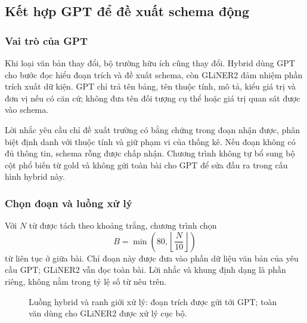 \subsection{Kết hợp GPT để đề xuất schema động}
\subsubsection{Vai trò của GPT}
Khi loại văn bản thay đổi, bộ trường hữu ích cũng thay đổi. Hybrid dùng GPT cho bước đọc hiểu đoạn trích và đề xuất schema, còn GLiNER2 đảm nhiệm phần trích xuất dữ kiện. GPT chỉ trả tên bảng, tên thuộc tính, mô tả, kiểu giá trị và đơn vị nếu có căn cứ; không đưa tên đối tượng cụ thể hoặc giá trị quan sát được vào schema.

Lời nhắc yêu cầu chỉ đề xuất trường có bằng chứng trong đoạn nhận được, phân biệt định danh với thuộc tính và giữ phạm vi của thống kê. Nếu đoạn không có đủ thông tin, schema rỗng được chấp nhận. Chương trình không tự bổ sung bộ cột phổ biến từ gold và không gửi toàn bài cho GPT để sửa đầu ra trong cấu hình hybrid này.

\subsubsection{Chọn đoạn và luồng xử lý}
Với $N$ từ được tách theo khoảng trắng, chương trình chọn
\begin{equation}
B=\min\left(80,\left\lfloor\frac{N}{10}\right\rfloor\right)
\end{equation}
từ liên tục ở giữa bài. Chỉ đoạn này được đưa vào phần dữ liệu văn bản của yêu cầu GPT; GLiNER2 vẫn đọc toàn bài. Lời nhắc và khung định dạng là phần riêng, không nằm trong tỷ lệ số từ nêu trên.

\begin{figure}[H]
\centering
{}
\caption{Luồng hybrid và ranh giới xử lý: đoạn trích được gửi tới GPT; toàn văn dùng cho GLiNER2 được xử lý cục bộ.}
\label{fig:hybrid}
\end{figure}

